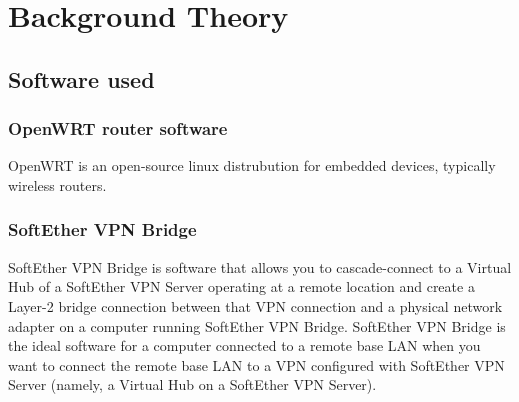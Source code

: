 \section{Background Theory}

\subsection{Software used}
\subsubsection{OpenWRT router software}
OpenWRT is an open-source linux distrubution for embedded devices, typically wireless routers.
\subsubsection{SoftEther VPN Bridge}
SoftEther VPN Bridge is software that allows you to cascade-connect to a Virtual Hub of a SoftEther VPN Server operating at a remote location and create a Layer-2 bridge connection between that VPN connection and a physical network adapter on a computer running SoftEther VPN Bridge. SoftEther VPN Bridge is the ideal software for a computer connected to a remote base LAN when you want to connect the remote base LAN to a VPN configured with SoftEther VPN Server (namely, a Virtual Hub on a SoftEther VPN Server).


